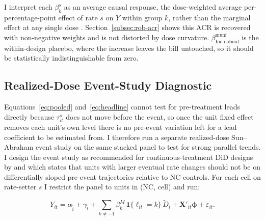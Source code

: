 \documentclass[12pt]{article}
\begin{document}
I interpret each $\beta^s_k$ as an average causal response, the
dose-weighted average per-percentage-point effect of rate $s$ on $Y$
within group $k$, rather than the marginal effect at any single dose
\citep{bakerDifferenceinDifferencesDesignsPractitioners2025,dechaisemartin2024}.
Section~\ref{subsec:rob-acr} shows this ACR is recovered with non-negative
weights and is not distorted by dose curvature.
$\beta^{\text{muni}}_{\text{Inc-nobind}}$ is the within-design placebo,
where the increase leaves the bill untouched, so it should be
statistically indistinguishable from zero.

\subsection{Realized-Dose Event-Study Diagnostic}
\label{subsec:pretrend-diagnostics}
\label{subsec:realized-dose-es}

Equations~\ref{eq:pooled} and~\ref{eq:headline}  cannot test for pre-treatment leads
directly because $\tau^s_{it}$ does not move before the event, so once
the unit fixed effect removes each unit's own level there is no
pre-event variation left for a lead coefficient to be estimated from. I therefore run a separate
realized-dose Sun--Abraham event study on the same stacked panel
to test for strong parallel trends. I design the event study as recommended
for continuous-treatment DiD designs by
\citet{callaway2021} and
\citet{dechaisemartin2024} which states that units with
larger eventual rate changes should not be on differentially sloped
pre-event trajectories relative to NC controls. For each cell on
rate-setter $s$ I restrict the panel to units in (NC, cell) and
run:

\begin{equation}
Y_{it} = \alpha_{\tilde i} + \gamma_{\tilde t}
+ \sum_{k \neq -1} \beta^M_k\, \mathbf{1}\{\ell_{it} = k\}\,
\widetilde{D}_i
+ \mathbf{X}'_{it}\boldsymbol{\phi} + \varepsilon_{it}.
\label{eq:realized-dose-es}
\end{equation}
\end{document}

